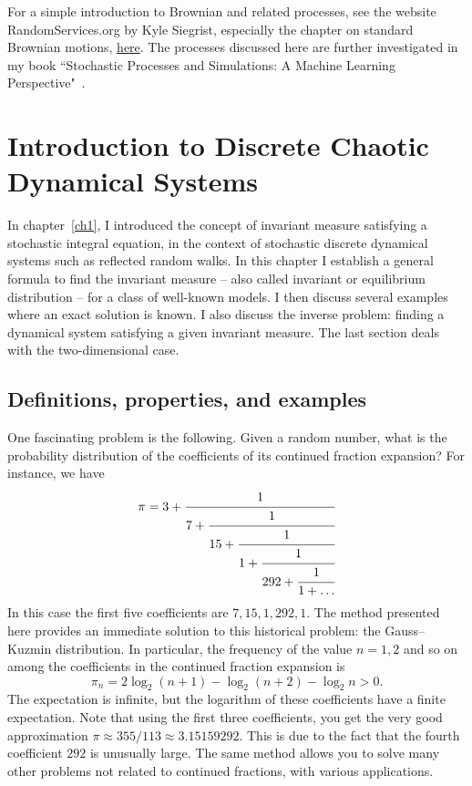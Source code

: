 \documentclass[oneside,10pt]{book}
\begin{document}
For a simple introduction to Brownian and related processes, see the website RandomServices.org by Kyle Siegrist, especially the chapter on
standard Brownian motions, \href{https://www.randomservices.org/random/brown/Standard.html}{here}. The processes discussed here are further investigated in my book ``Stochastic Processes and Simulations: A Machine Learning Perspective"~\cite{vgsimulnew}.


\chapter{Introduction to Discrete Chaotic Dynamical Systems}


In chapter~\ref{ch1}, I introduced the concept of invariant measure satisfying a stochastic integral equation, in the context of stochastic
 discrete dynamical systems such as reflected random walks. In this chapter I establish a general formula to find the invariant measure -- also called invariant or equilibrium distribution -- for a class of well-known models. I then discuss several examples where
 an exact solution is known. I also discuss the inverse problem:  finding a dynamical system satisfying a given invariant measure. The last section deals with the two-dimensional case.

\section{Definitions, properties, and examples}\label{oifvcd}

One fascinating problem is the following.  Given a random number, what is the probability distribution of the coefficients of its continued fraction expansion? For instance, we have
$$
\pi = 3 + \cfrac{1}{7 + \cfrac{1}{15 +\cfrac{1}{1 +\cfrac{1}{292 +\cfrac{1}{1 + \dots}}}}}
$$
In this case the first five coefficients are
 $7, 15, 1, 292, 1$. The method presented here provides an immediate solution to this historical problem: the Gauss–Kuzmin distribution. In particular, the frequency of the value $n=1,2$ and so on among the coefficients in the continued fraction expansion is
\begin{equation}
\pi_n = 2\log_2 (n+1) - \log_2 (n+2) - \log_2 n > 0.\label{tatar}
\end{equation}
The expectation is infinite, but the logarithm of these coefficients have a finite expectation. Note that using the first three coefficients, you get the very good approximation $\pi \approx 355/113  \approx 3.15159292$. This is due to the fact that the fourth coefficient $292$ is unusually large. The same method allows you to solve many other problems not related to continued fractions, with various applications.
\end{document}
